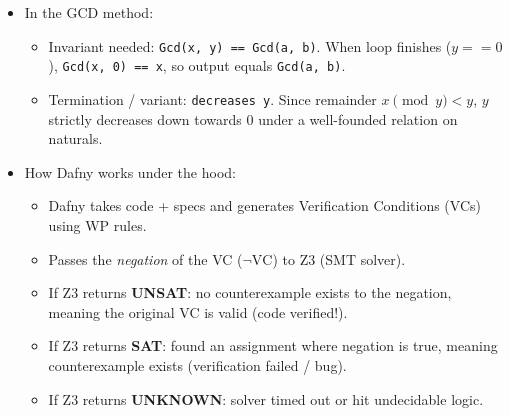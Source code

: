 \documentclass[11pt]{book}
\begin{document}
\begin{itemize}
    \item In the GCD method:
    \begin{itemize}
        \item Invariant needed: \texttt{Gcd(x, y) == Gcd(a, b)}. When loop finishes ($y == 0$), \texttt{Gcd(x, 0) == x}, so output equals \texttt{Gcd(a, b)}.
        \item Termination / variant: \texttt{decreases y}. Since remainder $x \pmod y < y$, $y$ strictly decreases down towards 0 under a well-founded relation on naturals.
    \end{itemize}

    \item How Dafny works under the hood:
    \begin{itemize}
        \item Dafny takes code + specs and generates Verification Conditions (VCs) using WP rules.
        \item Passes the \emph{negation} of the VC ($\neg \text{VC}$) to Z3 (SMT solver).
        \item If Z3 returns \textbf{UNSAT}: no counterexample exists to the negation, meaning the original VC is valid (code verified!).
        \item If Z3 returns \textbf{SAT}: found an assignment where negation is true, meaning counterexample exists (verification failed / bug).
        \item If Z3 returns \textbf{UNKNOWN}: solver timed out or hit undecidable logic.
    \end{itemize}
\end{itemize}
\end{document}
